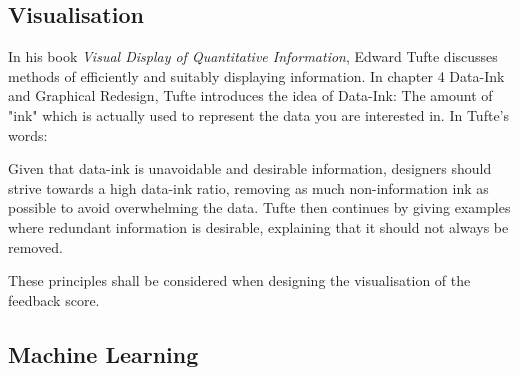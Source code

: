 \subsection{Visualisation}
In his book {\it Visual Display of Quantitative Information}\cite{tufte_book}, Edward Tufte discusses methods of efficiently and suitably displaying information. In chapter 4 Data-Ink and Graphical Redesign, Tufte introduces the idea of Data-Ink: The amount of "ink" which is actually used to represent the data you are interested in. In Tufte's words:


Given that data-ink is unavoidable and desirable information, designers should strive towards a high data-ink ratio, removing as much non-information ink as possible to avoid overwhelming the data. Tufte then continues by giving examples where redundant information is desirable, explaining that it should not always be removed.


These principles shall be considered when designing the visualisation of the feedback score.

\subsection{Machine Learning}
